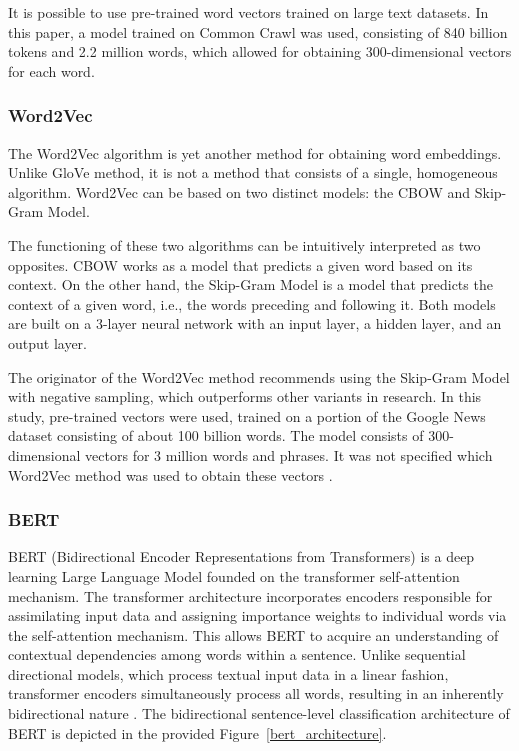 It is possible to use pre-trained word vectors trained on large text datasets. In this paper, a model trained on Common Crawl was used, consisting of 840 billion tokens and 2.2 million words, which allowed for obtaining 300-dimensional vectors for each word.

\subsubsection{Word2Vec}
The Word2Vec algorithm is yet another method for obtaining word embeddings. Unlike GloVe method, it is not a method that consists of a single, homogeneous algorithm. Word2Vec can be based on two distinct models: the CBOW and Skip-Gram Model.

The functioning of these two algorithms can be intuitively interpreted as two opposites. CBOW works as a model that predicts a given word based on its context. On the other hand, the Skip-Gram Model is a model that predicts the context of a given word, i.e., the words preceding and following it. Both models are built on a 3-layer neural network with an input layer, a hidden layer, and an output layer.

The originator of the Word2Vec method recommends using the Skip-Gram Model with negative sampling, which outperforms other variants in research. In this study, pre-trained vectors were used, trained on a portion of the Google News dataset consisting of about 100 billion words. The model consists of 300-dimensional vectors for 3 million words and phrases. It was not specified which Word2Vec method was used to obtain these vectors \autocite{Mikolov2013}.

\subsubsection{BERT}
BERT (Bidirectional Encoder Representations from Transformers) is a deep learning Large Language Model founded on the transformer self-attention mechanism. The transformer architecture incorporates encoders responsible for assimilating input data and assigning importance weights to individual words via the self-attention mechanism. This allows BERT to acquire an understanding of contextual dependencies among words within a sentence. Unlike sequential directional models, which process textual input data in a linear fashion, transformer encoders simultaneously process all words, resulting in an inherently bidirectional nature \autocite{Vaswani2017}. The bidirectional sentence-level classification architecture of BERT is depicted in the provided Figure~\ref{bert_architecture}.

